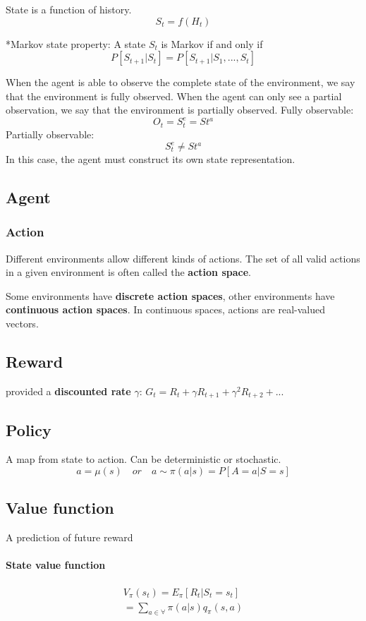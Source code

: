 \documentclass{article}
\begin{document}
\begin{CJK*}{UTF8}{gbsn}
State is a function of history. 
$$S_{t}=f(H_{t}) $$


*Markov state property: A state $S_{t}$ is Markov if and only if
$$P[S_{t+1}|S_{t}]= P[S_{t+1}|S_{1},...,S_{t}]$$

When the agent is able to observe the complete state of the environment, we say that the environment is fully observed. When the agent can only see a partial observation, we say that the environment is partially observed.
\newline
Fully observable:
$$O_{t}=S_{t}^{e}=S{t}^{a}$$
\newline
Partially observable:
$$S_{t}^{e}\neq S{t}^{a}$$
In this case, the agent must  construct its own state representation.
\subsection{Agent}

\subsubsection{Action}
Different environments allow different kinds of actions. The set of all valid actions in a given environment is often called the \textbf{action space}. 

Some environments have \textbf{discrete action spaces}, other environments have \textbf{continuous action spaces}. In continuous spaces, actions are real-valued vectors.


\subsection{Reward}
provided a \textbf{discounted rate} $\gamma$:
$G_{t}=R_{t}+\gamma R_{t+1}+\gamma^{2}R_{t+2}+...$

\subsection{Policy}
A map from state to action. Can be deterministic or stochastic.
$$a=\mu(s) \quad or \quad a \sim\pi(a|s)=P[A=a|S=s]$$

\subsection{Value function}
A prediction of future reward
\paragraph{State value function}
\begin{align*}
V_{\pi}(s_{t})=E_{\pi}[R_{t}|S_{t}=s_{t}] \\
= \sum_{a \in \forall} \pi(a|s)q_{\pi}(s,a) 
\end{align*}



\end{CJK*}
\end{document}
